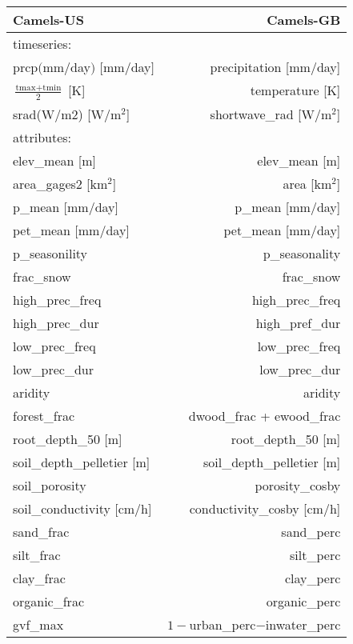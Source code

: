 \begin{tabular}{lr}
\toprule
Camels-US &     Camels-GB \\
\midrule
timeseries: & \\
\midrule
prcp$($mm$/$day$)$ $[$mm$/$day$]$ & precipitation [mm/day] \\
    $\frac{\text{tmax} + \text{tmin}}{2}$ [K] & temperature [K]\\
    srad(W/m2) [W$/$m$^2$] & shortwave\_rad [W$/$m$^2$] \\
\midrule
    attributes: & \\
\midrule
elev\_mean [m]  & elev\_mean [m] \\
area\_gages2 [km$^2$] & area [km$^2$] \\
p\_mean [mm/day] & p\_mean [mm/day] \\
    pet\_mean [mm/day] & pet\_mean [mm/day] \\
p\_seasonility & p\_seasonality \\
frac\_snow & frac\_snow \\
high\_prec\_freq & high\_prec\_freq \\
    high\_prec\_dur & high\_pref\_dur \\
    low\_prec\_freq & low\_prec\_freq \\
    low\_prec\_dur & low\_prec\_dur \\
aridity & aridity \\
forest\_frac & dwood\_frac + ewood\_frac \\ 
root\_depth\_50 [m] & root\_depth\_50 [m] \\
soil\_depth\_pelletier [m] & soil\_depth\_pelletier [m] \\
soil\_porosity & porosity\_cosby \\
soil\_conductivity [cm/h] & conductivity\_cosby [cm/h] \\
sand\_frac & sand\_perc \\
silt\_frac & silt\_perc \\ 
clay\_frac & clay\_perc \\ 
organic\_frac & organic\_perc \\
gvf\_max & $1 -$urban\_perc$-$inwater\_perc  \\
\bottomrule
\end{tabular}

